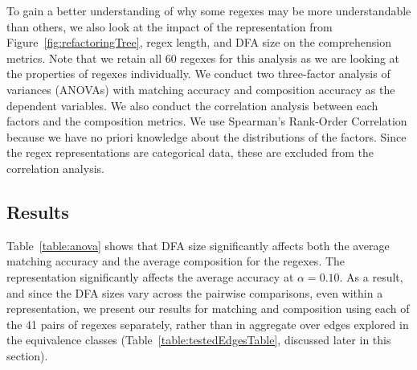 To gain a better understanding of why some regexes may be more understandable than others, we also look at the impact of the representation from Figure~\ref{fig:refactoringTree}, regex  length, and DFA size on the comprehension metrics. 
Note that  we retain all 60 regexes for this analysis as we are looking at the properties of regexes individually. 
We conduct  two three-factor analysis of variances (ANOVAs) with matching accuracy and composition accuracy as the dependent variables.
We also conduct the correlation analysis between each factors and the composition metrics. 
We use Spearman's Rank-Order Correlation because we have no priori knowledge about the distributions of the factors. 
Since  the regex representations are categorical data, these are excluded from the correlation analysis. 



\subsection{Results}
Table~\ref{table:anova} shows that DFA size significantly affects both the average matching accuracy and the average composition for the regexes.
The representation significantly affects the average accuracy at $\alpha = 0.10$. 
 As a result, and since the DFA sizes vary across the pairwise comparisons, even within a representation, we present our results for  matching and composition  using each of the 41 pairs of regexes separately, rather than in aggregate over edges explored in the equivalence classes (Table~\ref{table:testedEdgesTable}, discussed later in this section). 





